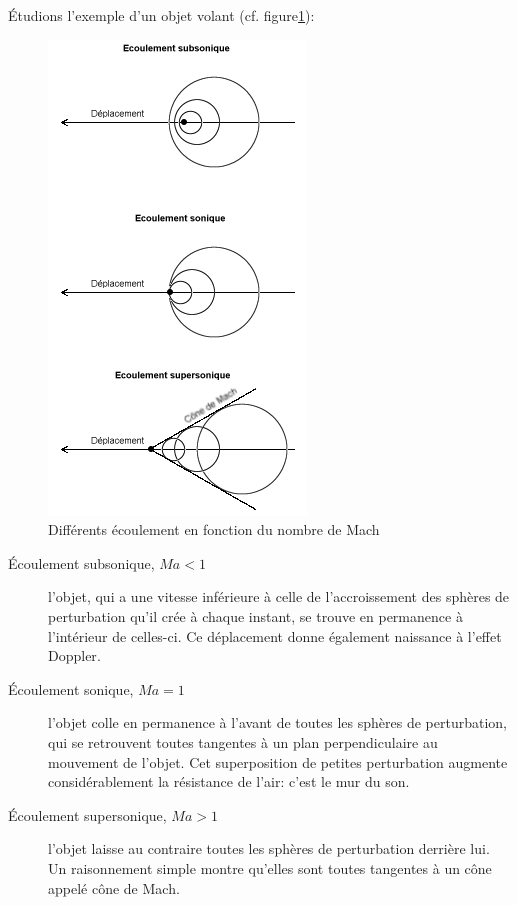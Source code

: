 \documentclass[10pt,a4paper]{article}
\begin{document}
Étudions l'exemple d'un objet volant (cf. figure\ref{fig:ecoulementmach}):
\begin{figure}
\centering
\includegraphics[scale=0.5]{ecoulementmach}
\caption{Différents écoulement en fonction du nombre de Mach}
\label{fig:ecoulementmach}
\end{figure}
\begin{description}
\item[Écoulement subsonique, $Ma<1$] l'objet, qui a une vitesse inférieure à celle de l'accroissement des sphères de perturbation qu'il crée à chaque instant, se trouve en permanence à l'intérieur de celles-ci. Ce déplacement donne également naissance à l'effet Doppler\cite{effetdoppler}.
\item[Écoulement sonique, $Ma=1$] l'objet colle en permanence à l'avant de toutes les sphères de perturbation, qui se retrouvent toutes tangentes à un plan perpendiculaire au mouvement de l'objet. Cet superposition de petites perturbation augmente considérablement la résistance de l'air: c'est le mur du son.
\item[Écoulement supersonique, $Ma>1$] l'objet laisse au contraire toutes les sphères de perturbation derrière lui. Un raisonnement simple montre qu'elles sont toutes tangentes à un cône appelé cône de Mach.
\end{description}

\end{document}
